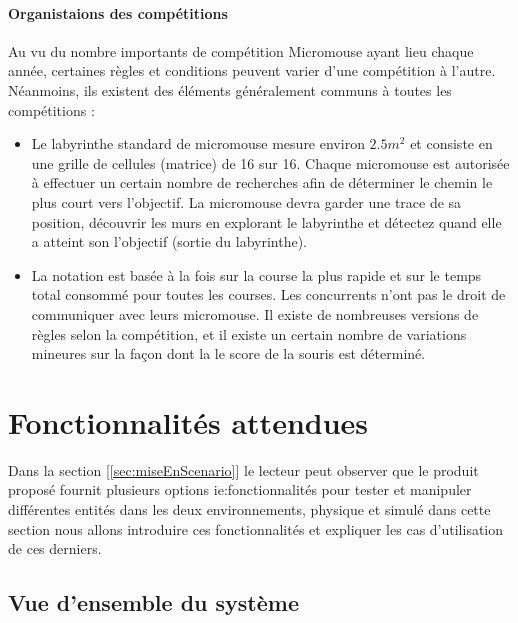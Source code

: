 \paragraph{Organistaions des compétitions}
   Au vu du nombre importants de compétition Micromouse ayant lieu chaque année,
certaines règles et conditions peuvent varier d'une compétition à l'autre.
Néanmoins, ils existent des éléments généralement communs à toutes les
compétitions : 
\\ 

\begin{itemize}

\item
   Le labyrinthe standard de micromouse mesure environ $2.5m^2$
et consiste en une grille de cellules (matrice) de 16 sur 16. Chaque micromouse
est autorisée à effectuer un certain nombre de recherches afin de déterminer le
chemin le plus court vers l'objectif.  La micromouse devra garder une trace de
sa position, découvrir les murs en explorant le labyrinthe et détectez quand
elle a atteint son l'objectif (sortie du labyrinthe). \\

\item
   La notation est basée à la fois sur la course la plus rapide et sur le temps
total consommé pour toutes les courses. Les concurrents n'ont pas le droit de
communiquer avec leurs micromouse.  Il existe de nombreuses versions de règles
selon la compétition, et il existe un certain nombre de variations mineures sur
la façon dont la le score de la souris est déterminé. \\

\end{itemize}


\clearpage
\section{Fonctionnalités attendues} \label{sec:foncAttendues}
   Dans la section [\ref{sec:miseEnScenario}] le lecteur peut observer que le
produit proposé fournit plusieurs options ie:fonctionnalités pour tester et
manipuler différentes entités dans les deux environnements, physique et
simulé dans cette section nous allons introduire ces fonctionnalités et
expliquer les cas d'utilisation de ces derniers.

\subsection{Vue d’ensemble du système} \label{sec:vueEns}

